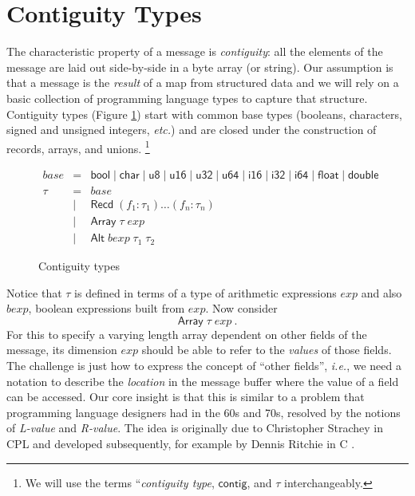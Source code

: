 \documentclass[a4paper,UKenglish,cleveref, autoref, thm-restate]{lipics-v2021}
\newcommand{\ie}{\textit{i.e.}}
\newcommand{\etc}{\textit{etc.}}
\newcommand{\konst}[1]{\ensuremath{\mathsf{#1}}}
\begin{document}
\section {Contiguity Types}

The characteristic property of a message is \emph{contiguity}: all the
elements of the message are laid out side-by-side in a byte array (or
string). Our assumption is that a message is the \emph{result} of a
map from structured data and we will rely on a basic collection of
programming language types to capture that structure. Contiguity types
(Figure \ref{contig-types}) start with common base types (booleans,
characters, signed and unsigned integers, \etc) and are closed under
the construction of records, arrays, and unions. \footnote{We will use
the terms ``\emph{contiguity type}, \konst{contig}, and $\tau$
interchangeably.}

\begin{figure}
\[
\begin{array}{rcl}
 \mathit{base} & = & \konst{bool} \mid \konst{char} \mid \konst{u8} \mid
 \konst{u16} \mid \konst{u32} \mid \konst{u64}  \mid \konst{i16} \mid
 \konst{i32} \mid \konst{i64} \mid \konst{float} \mid \konst{double} \\
 \tau & = & \mathit{base} \\
      & \mid & \konst{Recd}\; (f_1 : \tau_1) \ldots (f_n : \tau_n) \\
      & \mid & \konst{Array}\; \tau \; \mathit{exp} \\
      & \mid & \konst{Alt}\; \mathit{bexp}\; \tau_1 \; \tau_2
\end{array}
\]
\caption{Contiguity types}
\label{contig-types}
\end{figure}

Notice that $\tau$ is defined in terms of a type of arithmetic
expressions $\mathit{exp}$ and also $\mathit{bexp}$, boolean
expressions built from $\mathit{exp}$. Now consider
%
\[
 \konst{Array} \; \tau \; \mathit{exp} \ .
\]
%
For this to specify a varying length array dependent on other fields
of the message, its dimension $\mathit{exp}$ should be able to refer
to the \emph{values} of those fields. The challenge is just how to
express the concept of ``other fields'', \ie, we need a notation to
describe the \emph{location} in the message buffer where the value of
a field can be accessed. Our core insight is that this is similar to a
problem that programming language designers had in the 60s and 70s,
resolved by the notions of \emph{L-value} and \emph{R-value}. The idea
is originally due to Christopher Strachey in CPL \cite{strachey} and
developed subsequently, for example by Dennis Ritchie in
C \cite{dmr-lvals}.
\end{document}
